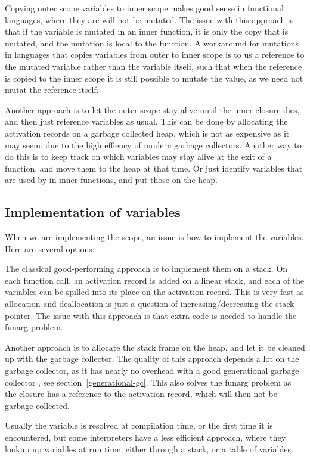 \documentclass[11pt]{report}
\begin{document}
Copying outer scope variables to inner scope makes good sense in functional languages, where they are will not be mutated. The issue with this approach is that if the variable is mutated in an inner function, it is only the copy that is mutated, and the mutation is local to the function.
A workaround for mutations in languages that copies variables from outer to inner scope is to us a reference to the mutated variable rather than the variable itself, such that when the reference is copied to the inner scope it is still possible to mutate the value, as we need not mutat the reference itself.

Another approach is to let the outer scope stay alive until the inner closure dies, and then just reference variables as usual.
This can be done by allocating the activation records on a garbage collected heap,
which is not as expensive as it may seem, due to the high effiency of modern garbage collectors.
Another way to do this is to keep track on which variables may stay alive at the exit of a function, and move them to the heap at that time.
Or just identify variables that are used by in inner functions, and put those on the heap.

\subsection{Implementation of variables}
When we are implementing the scope, an issue is how to implement the variables. 
Here are several options: 

The  classical good-performing approach is to implement them on a stack. On each function call, an activation record is added on a linear stack, and each of the variables can be spilled into its place on the activation record. This is very fast as allocation and deallocation is just a question of increasing/decreasing the stack pointer. The issue with this approach is that extra code is needed to handle the funarg problem.

Another approach is to allocate the stack frame on the heap, and let it be cleaned up with the garbage collector. The quality of this approach depends a lot on the garbage collector, as it has nearly no overhead with a good generational garbage collector \cite{generational-heap}, see section~\ref{generational-gc}.
This also solves the funarg problem as the closure has a reference to the activation record, which will then not be garbage collected.

Usually the variable is resolved at compilation time, or the first time it is encountered, but 
some interpreters have a less efficient approach, where they lookup up variables at run time, either through a stack, or a table of variables.
\end{document}
